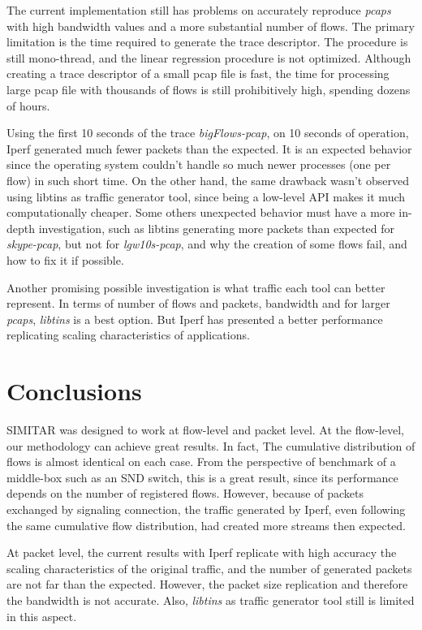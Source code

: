 The current implementation still has problems on accurately reproduce \textit{pcaps} with high bandwidth values and a more substantial number of flows. The primary limitation is the time required to generate the trace descriptor.  The procedure is still mono-thread, and the linear regression procedure is not optimized. Although creating a trace descriptor of a small pcap file is fast, the time for processing large pcap file with thousands of flows is still prohibitively high, spending dozens of hours. 

Using the first 10 seconds of the trace \textit{bigFlows-pcap}, on 10 seconds of operation, Iperf generated much fewer packets than the expected. It is an expected behavior since the operating system couldn't handle so much newer processes (one per flow) in such short time. On the other hand, the same drawback wasn't observed using libtins as traffic generator tool, since being a low-level API makes it much computationally cheaper.  Some others unexpected behavior must have a more in-depth investigation, such as libtins generating more packets than expected for \textit{skype-pcap}, but not for \textit{lgw10s-pcap}, and why the creation of some flows fail, and how to fix it if possible. 

Another promising possible investigation is what traffic each tool can better represent. In terms of number of flows and packets, bandwidth and for larger \textit{pcaps}, \textit{libtins} is a best option. But Iperf has presented a better performance replicating scaling characteristics of applications. 

\section{Conclusions}\label{sec:conclusion}


SIMITAR was designed to work at flow-level and packet level. At the flow-level, our methodology can achieve great results. In fact,  The cumulative distribution of flows is almost identical on each case. From the perspective of benchmark of a middle-box such as an SND switch, this is a great result, since its performance depends on the number of registered flows. However, because of packets exchanged by signaling connection, the traffic generated by Iperf, even following the same cumulative flow distribution, had created more streams then expected. 

At packet level, the current results with Iperf replicate with high accuracy the scaling characteristics of the original traffic, and the number of generated packets are not far than the expected. However, the packet size replication and therefore the bandwidth is not accurate. Also, \textit{libtins} as traffic generator tool still is limited in this aspect.


